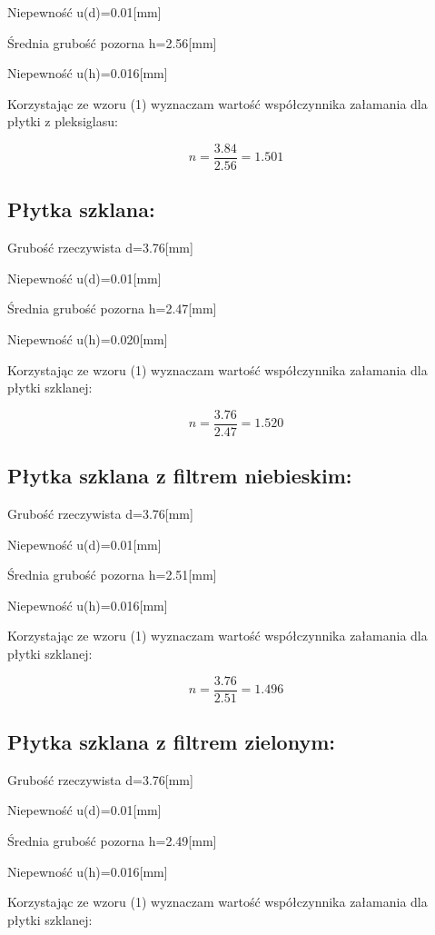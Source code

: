 \documentclass{article}
\begin{document}
	\noindent Niepewność u(d)=0.01[mm]
	
	\noindent Średnia grubość pozorna h=2.56[mm]
	
	\noindent Niepewność u(h)=0.016[mm]
	
	\noindent Korzystając ze wzoru (1) wyznaczam wartość współczynnika załamania dla płytki z pleksiglasu:
	
	\[
	    n=\frac{3.84}{2.56}=1.501
	\]
	
	\subsection{Płytka szklana:}
	Grubość rzeczywista d=3.76[mm]
	
	\noindent Niepewność u(d)=0.01[mm]
	
	\noindent Średnia grubość pozorna h=2.47[mm]
	
	\noindent Niepewność u(h)=0.020[mm]
	
	\noindent Korzystając ze wzoru (1) wyznaczam wartość współczynnika załamania dla płytki szklanej:
	
	\[
	    n=\frac{3.76}{2.47}=1.520
	\]
	
	\subsection{Płytka szklana z filtrem niebieskim:}
	Grubość rzeczywista d=3.76[mm]
	
	\noindent Niepewność u(d)=0.01[mm]
	
	\noindent Średnia grubość pozorna h=2.51[mm]
	
	\noindent Niepewność u(h)=0.016[mm]
	
	\noindent Korzystając ze wzoru (1) wyznaczam wartość współczynnika załamania dla płytki szklanej:
	
	\[
	    n=\frac{3.76}{2.51}=1.496
	\]
	
	\subsection{Płytka szklana z filtrem zielonym:}
	Grubość rzeczywista d=3.76[mm]
	
	\noindent Niepewność u(d)=0.01[mm]
	
	\noindent Średnia grubość pozorna h=2.49[mm]
	
	\noindent Niepewność u(h)=0.016[mm]
	
	\noindent Korzystając ze wzoru (1) wyznaczam wartość współczynnika załamania dla płytki szklanej:
	
\end{document}
